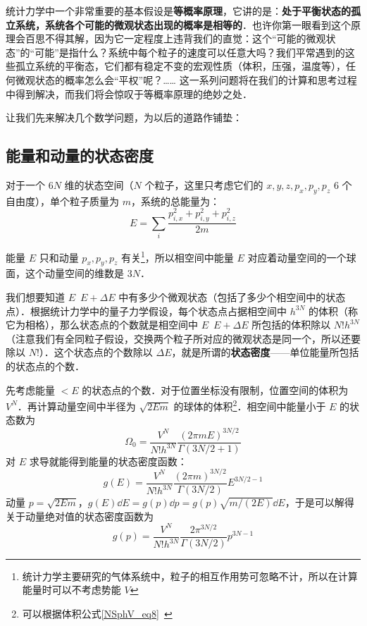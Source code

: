 
\begin{issues}
\issueDraft
\end{issues}


统计力学中一个非常重要的基本假设是\textbf{等概率原理}，它讲的是：\textbf{处于平衡状态的孤立系统，系统各个可能的微观状态出现的概率是相等的}．也许你第一眼看到这个原理会百思不得其解，因为它一定程度上违背我们的直觉：这个“可能的微观状态”的“可能”是指什么？系统中每个粒子的速度可以任意大吗？我们平常遇到的这些孤立系统的平衡态，它们都有稳定不变的宏观性质（体积，压强，温度等），任何微观状态的概率怎么会“平权”呢？…… 这一系列问题将在我们的计算和思考过程中得到解决，而我们将会惊叹于等概率原理的绝妙之处．

让我们先来解决几个数学问题，为以后的道路作铺垫：
\subsection{能量和动量的状态密度}
对于一个 $6N$ 维的状态空间（$N$ 个粒子，这里只考虑它们的 $x,y,z,p_x,p_y,p_z$ $6$ 个自由度），单个粒子质量为 $m$，系统的总能量为：
\begin{equation}
E=\sum_{i} \frac{p_{i,x}^2+p_{i,y}^2+p_{i,z}^2}{2m}
\end{equation}

能量 $E$ 只和动量 $p_x,p_y,p_z$ 有关\footnote{统计力学主要研究的气体系统中，粒子的相互作用势可忽略不计，所以在计算能量时可以不考虑势能 $V$}，所以相空间中能量 $E$ 对应着动量空间的一个球面，这个动量空间的维数是 $3N$．

我们想要知道 $E$~$E+\Delta E$ 中有多少个微观状态（包括了多少个相空间中的状态点）．根据统计力学中的量子力学假设，每个状态点占据相空间中 $h^{3N}$ 的体积（称它为相格），那么状态点的个数就是相空间中 $E$~$E+\Delta E$ 所包括的体积除以 $N!h^{3N}$（注意我们有全同粒子假设，交换两个粒子所对应的微观状态是同一个，所以还要除以 $N!$）．这个状态点的个数除以 $\Delta E$，就是所谓的\textbf{状态密度}——单位能量所包括的状态点的个数．

先考虑能量 $<E$ 的状态点的个数．对于位置坐标没有限制，位置空间的体积为 $V^N$．再计算动量空间中半径为 $\sqrt{2Em}$ 的球体的体积\footnote{可以根据体积公式\autoref{NSphV_eq8}~}．相空间中能量小于 $E$ 的状态数为
\begin{equation}\label{IdSDp_eq2}
\Omega_0 = \frac{V^N}{N! h^{3N}} \frac{(2\pi mE)^{3N/2}}{\Gamma(3N/2+1)}
\end{equation}
对 $E$ 求导就能得到能量的状态密度函数：
\begin{equation}\label{IdSDp_eq3}
g(E) = \frac{V^N}{N! h^{3N}} \frac{(2\pi m)^{3N/2}}{\Gamma(3N/2)} E^{3N/2 - 1}
\end{equation}
动量 $p=\sqrt{2Em}$，$g(E)\dd E=g(p)\dd p=g(p)\sqrt{m/(2E)}\dd E$，于是可以解得关于动量绝对值的状态密度函数为
\begin{equation}\label{IdSDp_eq4}
g(p) = \frac{V^N}{N! h^{3N}} \frac{2\pi^{3N/2}}{\Gamma(3N/2)} p^{3N - 1}
\end{equation}


